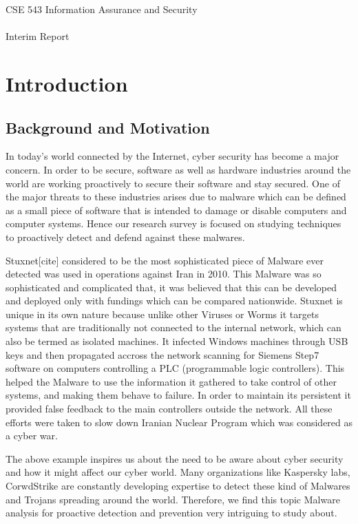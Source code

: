 \documentclass[16pt]{article}
\title{\fulltitle}
\author{Tejas Khairnar (1207690220, Group Leader) \\Sujay Vaishampayan (1209248166, Deputy Group Leader)\\  Zhibo Sun(1207644187)\\Harshil Maskai (1209174092)\\ Aloma Lopes (1209273126)\\ Chaitanya Palaka (1209261868)\\ Varun Chandrasekar (1209248010) \\ Kunal Bansal (1211213169) \\ Raj Dalvi (1209232176) \\ Vimal Vadivelu (1209203043)\\ \\
		Arizona State University}
\begin{document}
	\begingroup
		\fontsize{15pt}{15pt}\selectfont
		\begin{center}
			CSE 543 Information Assurance and Security \\~\\
			Interim Report
		\end{center}
	\endgroup
	{\let\newpage\relax\maketitle}
	\section{Introduction}
	\subsection{Background and Motivation}
	In today’s world connected by the Internet, cyber security has become a major concern. In order
to be secure, software as well as hardware industries around the world are working proactively to
secure their software and stay secured. One of the major threats to these industries arises due to
malware which can be defined as a small piece of software that is intended to damage or disable
computers and computer systems. Hence our research survey is focused on studying techniques
to proactively detect and defend against these malwares.

Stuxnet[cite] considered to be the most sophisticated piece of Malware ever detected was used in operations against Iran in 2010. This Malware was so sophisticated and complicated that, it was believed that this can be developed and deployed only with fundings which can be compared nationwide. Stuxnet is unique in its own nature because unlike other Viruses or Worms it targets systems that are traditionally not connected to the internal network, which can also be termed as isolated machines. It infected Windows machines through USB keys and then propagated accross the network scanning for Siemens Step7 software on computers controlling a PLC (programmable logic controllers). This helped the Malware to use the information it gathered to take control of other systems, and making them behave to failure. In order to maintain its persistent it provided false feedback to the main controllers outside the network. All these efforts were taken to slow down Iranian Nuclear Program which was considered as a cyber war.

The above example inspires us about the need to be aware about cyber security and how it might affect our cyber world. Many organizations like Kaspersky labs, CorwdStrike are constantly developing expertise to detect these kind of Malwares and Trojans spreading around the world. Therefore, we find this topic Malware analysis for proactive detection and prevention very intriguing to study about.
\end{document}
